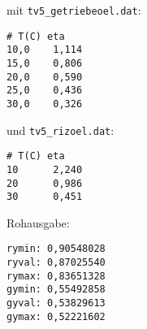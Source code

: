     mit \texttt{tv5\_getriebeoel.dat}:
    \begin{verbatim}
# T(C) eta
10,0    1,114
15,0    0,806
20,0    0,590
25,0    0,436
30,0    0,326
    \end{verbatim}
    \newpage
    und \texttt{tv5\_rizoel.dat}:
    \begin{verbatim}
# T(C) eta
10      2,240
20      0,986
30      0,451
    \end{verbatim}
    Rohausgabe:
    \begin{verbatim}
rymin: 0,90548028
ryval: 0,87025540
rymax: 0,83651328
gymin: 0,55492858
gyval: 0,53829613
gymax: 0,52221602
    \end{verbatim}